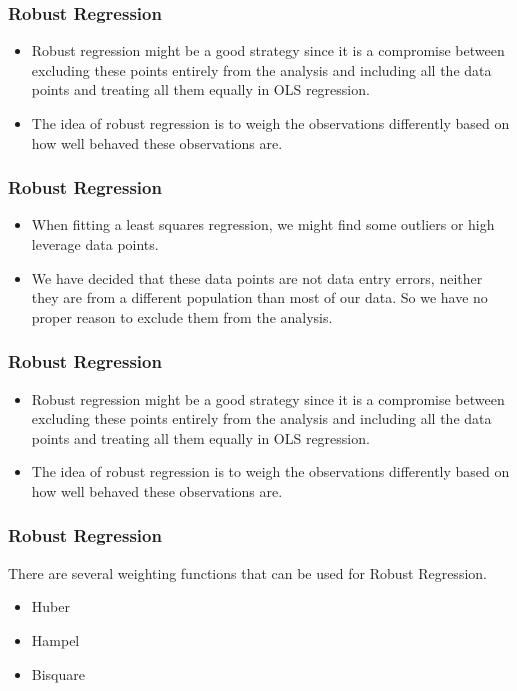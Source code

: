 \documentclass{beamer}
\begin{document}
\begin{frame}
	\frametitle{Robust Regression}
	\large
\begin{itemize}
	\item Robust regression might be a good strategy since it is a compromise between excluding these points 
	entirely from the analysis and including all the data points and treating all them equally in OLS 
	regression. 
	\item 
	The idea of robust regression is to weigh the observations differently based on how well 
	behaved these observations are. 
\end{itemize}
\end{frame}
\begin{frame}
	\frametitle{Robust Regression}
	\begin{itemize}
		\item When fitting a least squares regression, we might find some outliers or high leverage data points. 
		\item We have decided that these data points are not data entry errors, neither they are from a different 
		population than most of our data. So we have no proper reason to exclude them from the analysis. 
	\end{itemize}
\end{frame}
\begin{frame}
	\frametitle{Robust Regression}
	\begin{itemize}
		\item Robust regression might be a good strategy since it is a compromise between excluding these points 
		entirely from the analysis and including all the data points and treating all them equally in OLS 
		regression. 
		\item The idea of robust regression is to weigh the observations differently based on how well 
		behaved these observations are.
	\end{itemize}
	
\end{frame}
\begin{frame}
	\frametitle{Robust Regression}
	\large
	There are several weighting functions that can be used for Robust Regression. 
	
	\begin{itemize}
		\item Huber
		\item Hampel
		\item Bisquare
	\end{itemize}
	\end{frame}
\end{document}
